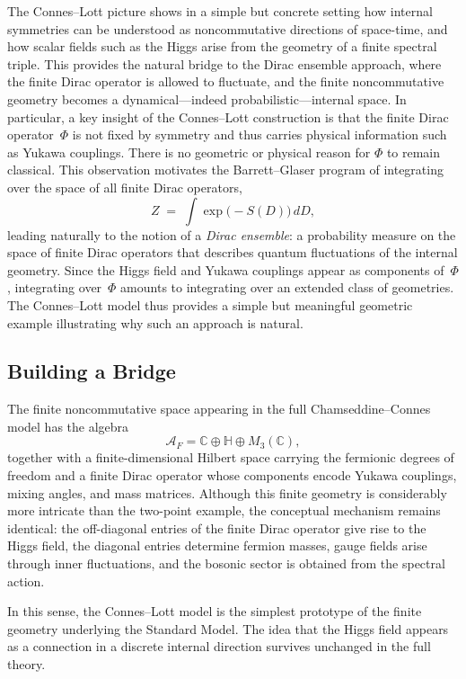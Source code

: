 \documentclass[11pt]{article}
\theoremstyle{plain}
\begin{document}
\medskip


The Connes--Lott picture shows in a simple but concrete setting how internal symmetries can be understood as noncommutative directions of space-time, and how scalar fields such as the Higgs arise from the geometry of a finite spectral triple.  This provides the natural bridge to the Dirac ensemble approach, where the finite Dirac operator is allowed to fluctuate, and the finite noncommutative geometry becomes a dynamical—indeed probabilistic—internal space. In particular, a key insight of the Connes--Lott construction is that the finite Dirac operator~$\Phi$ is not fixed by symmetry and thus carries physical information such as Yukawa couplings.  There is no geometric or physical reason for $\Phi$ to remain classical.  This observation motivates the Barrett--Glaser program of integrating over the space of all finite Dirac operators,
\[
Z \;=\; \int \exp\!\bigl(-S(D)\bigr)\, dD,
\]
leading naturally to the notion of a \emph{Dirac ensemble}: a probability measure on the space of finite Dirac operators that describes quantum fluctuations of the internal geometry.  Since the Higgs field and Yukawa couplings appear as components of~$\Phi$, integrating over~$\Phi$ amounts to integrating over an extended class of geometries.  The Connes--Lott model thus provides a simple but meaningful geometric example illustrating why such an approach is natural.


\subsection{Building a Bridge}

The finite noncommutative space appearing in the full Chamseddine--Connes model has the
algebra
\[
\mathcal{A}_{F} = \mathbb{C} \oplus \mathbb{H} \oplus M_{3}(\mathbb{C}),
\]
together with a finite-dimensional Hilbert space carrying the fermionic degrees of freedom
and a finite Dirac operator whose components encode Yukawa couplings, mixing angles, and
mass matrices.  
Although this finite geometry is considerably more intricate than the two-point example,
the conceptual mechanism remains identical: the off-diagonal entries of the finite Dirac
operator give rise to the Higgs field, the diagonal entries determine fermion masses,
gauge fields arise through inner fluctuations, and the bosonic sector is obtained from the
spectral action.

In this sense, the Connes--Lott model is the simplest prototype of the finite geometry
underlying the Standard Model.  
The idea that the Higgs field appears as a connection in a discrete internal direction
survives unchanged in the full theory.
\end{document}

